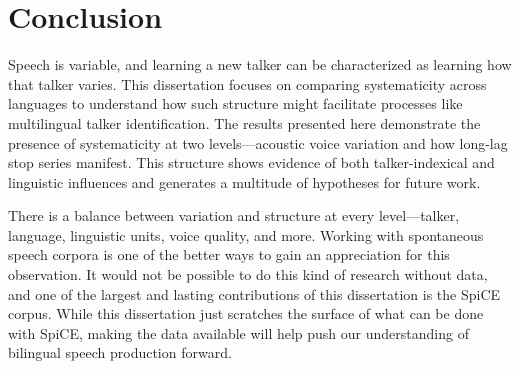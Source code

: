 \section{Conclusion}\label{ch5:sec:conclusion}

Speech is variable, and learning a new talker can be characterized as learning how that talker varies. This dissertation focuses on comparing systematicity across languages to understand how such structure might facilitate processes like multilingual talker identification. The results presented here demonstrate the presence of systematicity at two levels---acoustic voice variation and how long-lag stop series manifest. This structure shows evidence of both talker-indexical and linguistic influences and generates a multitude of hypotheses for future work. 

There is a balance between variation and structure at every level---talker, language, linguistic units, voice quality, and more. Working with spontaneous speech corpora is one of the better ways to gain an appreciation for this observation. It would not be possible to do this kind of research without data, and one of the largest and lasting contributions of this dissertation is the SpiCE corpus. While this dissertation just scratches the surface of what can be done with SpiCE, making the data available will help push our understanding of bilingual speech production forward. 

\endinput %
